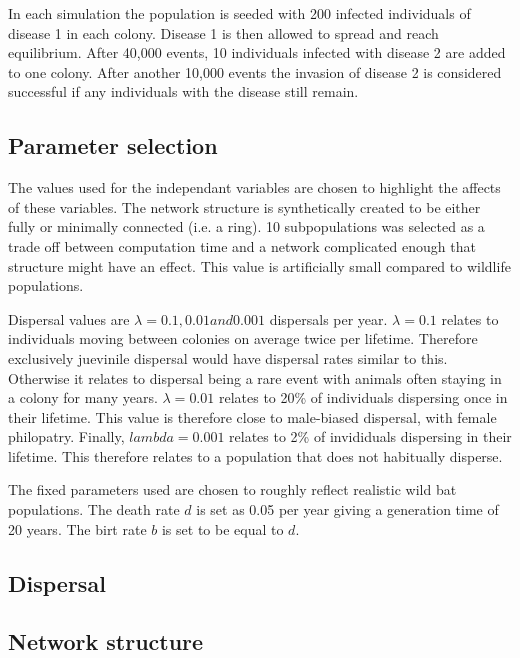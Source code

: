 In each simulation the population is seeded with 200 infected individuals of disease 1 in each colony. 
Disease 1 is then allowed to spread and reach equilibrium. 
After 40,000 events, 10 individuals infected with disease 2 are added to one colony. 
After another 10,000 events the invasion of disease 2 is considered successful if any individuals with the disease still remain.



\subsection{Parameter selection}

The values used for the independant variables are chosen to highlight the affects of these variables. 
The network structure is synthetically created to be either fully or minimally connected (i.e. a ring). 
10 subpopulations was selected as a trade off between computation time and a network complicated enough that structure might have an effect. 
This value is artificially small compared to wildlife populations. 

Dispersal values are $\lambda = 0.1, 0.01 and 0.001$ dispersals per year. 
$\lambda = 0.1$ relates to individuals moving between colonies on average twice per lifetime. 
Therefore exclusively juevinile dispersal would have dispersal rates similar to this. 
Otherwise it relates to dispersal being a rare event with animals often staying in a colony for many years.
$\lambda = 0.01$ relates to 20\% of individuals dispersing once in their lifetime.
This value is therefore close to male-biased dispersal, with female philopatry. 
Finally, $lambda = 0.001$ relates to 2\% of invididuals dispersing in their lifetime.
This therefore relates to a population that does not habitually disperse.

The fixed parameters used are chosen to roughly reflect realistic wild bat populations. 
The death rate $d$ is set as 0.05 per year giving a generation time of 20 years.
The birt rate $b$ is set to be equal to $d$.




\subsection{Dispersal}



\subsection{Network structure}


